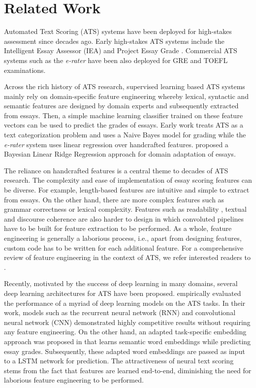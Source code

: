 \documentclass[letterpaper]{article}
\begin{document}
\section{Related Work}
Automated Text Scoring (ATS) systems have been deployed for high-stakes assessment since decades ago. Early high-stakes ATS systems include the Intelligent Essay Assessor (IEA) \cite{foltz2013implementation} and Project Essay Grade \cite{page1967grading,shermis2003automated}. Commercial ATS systems such as the \textit{e-rater} \cite{attali2004automated} have been also deployed for GRE and TOEFL examinations. 

Across the rich history of ATS research, supervised learning based ATS systems mainly rely on domain-specific feature engineering whereby lexical, syntactic and semantic features are designed by domain experts and subsequently extracted from essays. Then, a simple machine learning classifier trained on these feature vectors can be used to predict the grades of essays. Early work \cite{larkey1998automatic} treats ATS as a text categorization problem and uses a Naive Bayes model for grading while the \textit{e-rater} system uses linear regression over handcrafted features. \cite{DBLP:conf/emnlp/PhandiCN15} proposed a Bayesian Linear Ridge Regression approach for domain adaptation of essays. 

 The reliance on handcrafted features is a central theme to decades of ATS research. The complexity and ease of implementation of essay scoring features can be diverse. For example, length-based features are intuitive and simple to extract from essays. On the other hand, there are more complex features such as grammar correctness or lexical complexity. Features such as readability \cite{DBLP:conf/bea/ZeschWS15}, textual and discourse coherence \cite{DBLP:conf/emnlp/ChenH13,somasundaran2014lexical} are also harder to design in which convoluted pipelines have to be built for feature extraction to be performed. As a whole, feature engineering is generally a laborious process, i.e., apart from designing features, custom code has to be written for each additional feature. For a comprehensive review of feature engineering in the context of ATS, we refer interested readers to \cite{DBLP:conf/bea/ZeschWS15}. 

Recently, motivated by the success of deep learning in many domains, several deep learning architectures for ATS have been proposed. \cite{DBLP:conf/emnlp/TaghipourN16,DBLP:conf/emnlp/DongZ16} empirically evaluated the performance of a myriad of deep learning models on the ATS tasks. In their work, models such as the recurrent neural network (RNN) and convolutional neural network (CNN) demonstrated highly competitive results without requiring any feature engineering. On the other hand, an adapted task-specific embedding approach was proposed in \cite{DBLP:conf/acl/AlikaniotisYR16} that learns semantic word embeddings while predicting essay grades. Subsequently, these adapted word embeddings are passed as input to a LSTM network for prediction. The attractiveness of neural text scoring stems from the fact that features are learned end-to-end, diminishing the need for laborious feature engineering to be performed. 
\end{document}
